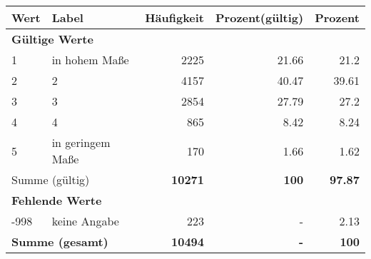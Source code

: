      \begin{longtable}{lXrrr}
     \toprule
     \textbf{Wert} & \textbf{Label} & \textbf{Häufigkeit} & \textbf{Prozent(gültig)} & \textbf{Prozent} \\
     \endhead
     \midrule
     \multicolumn{5}{l}{\textbf{Gültige Werte}}\\

     1 &
     \multicolumn{1}{X}{ in hohem Maße   } &


       \num{2225} &
       \num[round-mode=places,round-precision=2]{21.66} &
         \num[round-mode=places,round-precision=2]{21.2} \\

     2 &
     \multicolumn{1}{X}{ 2   } &


       \num{4157} &
       \num[round-mode=places,round-precision=2]{40.47} &
         \num[round-mode=places,round-precision=2]{39.61} \\

     3 &
     \multicolumn{1}{X}{ 3   } &


       \num{2854} &
       \num[round-mode=places,round-precision=2]{27.79} &
         \num[round-mode=places,round-precision=2]{27.2} \\

     4 &
     \multicolumn{1}{X}{ 4   } &


       \num{865} &
       \num[round-mode=places,round-precision=2]{8.42} &
         \num[round-mode=places,round-precision=2]{8.24} \\

     5 &
     \multicolumn{1}{X}{ in geringem Maße   } &


       \num{170} &
       \num[round-mode=places,round-precision=2]{1.66} &
         \num[round-mode=places,round-precision=2]{1.62} \\
     \midrule
     \multicolumn{2}{l}{Summe (gültig)} &
       \textbf{\num{10271}} &
     \textbf{\num{100}} &
       \textbf{\num[round-mode=places,round-precision=2]{97.87}} \\
     \multicolumn{5}{l}{\textbf{Fehlende Werte}}\\
       -998 &
       keine Angabe &
         \num{223} &
        - &
         \num[round-mode=places,round-precision=2]{2.13} \\
     \midrule
     \multicolumn{2}{l}{\textbf{Summe (gesamt)}} &
          \textbf{\num{10494}} &
        \textbf{-} &
        \textbf{\num{100}} \\
     \bottomrule
     \end{longtable}
     

